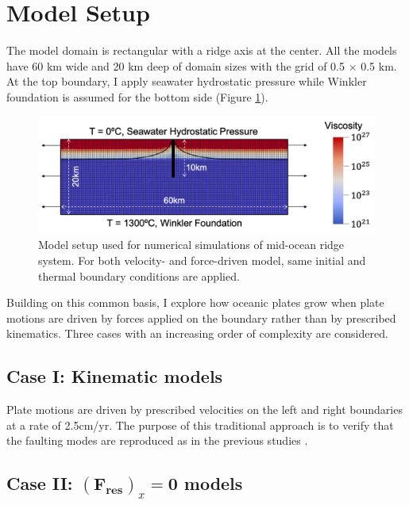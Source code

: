 \documentclass[letterpaper,12pt,notitle]{memphisthesis}                     %
\begin{document}
\section{Model Setup}
The model domain is rectangular with a ridge axis at the center. All the models have 60 km wide and 20 km deep of domain sizes with the grid of 0.5 $\times$ 0.5 km. At the top boundary, I apply seawater hydrostatic pressure while Winkler foundation is assumed for the bottom side (Figure \ref{fig:modelsetup}).
%
\begin{figure}[!htb]
	\centering
	\includegraphics[width=0.8\linewidth]{./figs/modelsetup.png}
	\caption{Model setup used for numerical simulations of mid-ocean ridge system. For both velocity- and force-driven model, same initial and thermal boundary conditions are applied.}
	\label{fig:modelsetup}
\end{figure}
%

Building on this common basis, I explore how oceanic plates grow when plate motions are driven by forces applied on the boundary rather than by prescribed kinematics. Three cases with an increasing order of complexity are considered.

\subsection{Case I: Kinematic models}

Plate motions are driven by prescribed velocities on the left and right boundaries at a rate of 2.5cm/yr. The purpose of this traditional approach is to verify that the faulting modes are reproduced as in the previous studies \citep{Buck2005,Tucholke2008}.

\subsection{Case II: $(\boldsymbol{F_{res}})_x \mathbf{=0}$ models}
\end{document}
